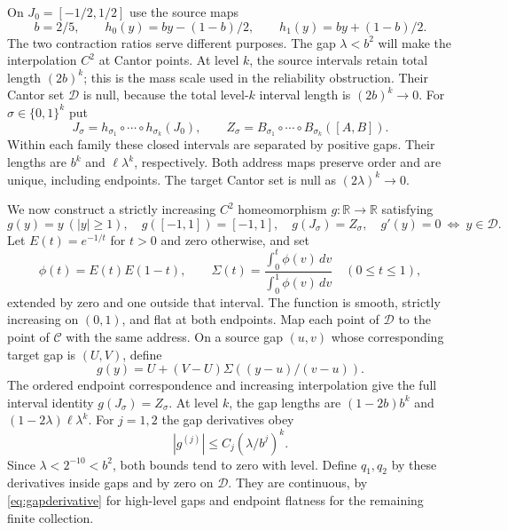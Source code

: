 \documentclass[11pt]{amsart}
\theoremstyle{definition}
\theoremstyle{remark}
\newcommand{\R}{\mathbb R}
\numberwithin{equation}{section}
\begin{document}
On $J_0=[-1/2,1/2]$ use the source maps
\[
b=2/5,\qquad h_0(y)=by-(1-b)/2,
\qquad h_1(y)=by+(1-b)/2.
\]
The two contraction ratios serve different purposes. The gap
$\lambda<b^2$ will make the interpolation $C^2$ at Cantor points.
At level $k$, the source intervals retain total length $(2b)^k$;
this is the mass scale used in the reliability obstruction.
Their Cantor set $\mathcal D$ is null, because the total level-$k$
interval length is $(2b)^k\to0$. For $\sigma\in\{0,1\}^k$ put
\[
J_\sigma=h_{\sigma_1}\circ\cdots\circ h_{\sigma_k}(J_0),
\qquad Z_\sigma=B_{\sigma_1}\circ\cdots\circ B_{\sigma_k}([A,B]).
\]
Within each family these closed intervals are separated by positive
gaps. Their lengths are $b^k$ and $\ell\lambda^k$, respectively.
Both address maps preserve order and are unique, including endpoints.
The target Cantor set is null as $(2\lambda)^k\to0$.

We now construct a strictly increasing $C^2$ homeomorphism
$g:\R\to\R$ satisfying
\begin{equation}\label{eq:flatmapproperties}
g(y)=y\ (|y|\ge1),\quad g([-1,1])=[-1,1],\quad
g(J_\sigma)=Z_\sigma,\quad g'(y)=0\ \Longleftrightarrow\ y\in\mathcal D.
\end{equation}
Let $E(t)=e^{-1/t}$ for $t>0$ and zero otherwise, and set
\[
\phi(t)=E(t)E(1-t),\qquad
\Sigma(t)=\frac{\int_0^t\phi(v)\,dv}{\int_0^1\phi(v)\,dv}
\quad(0\le t\le1),
\]
extended by zero and one outside that interval. The function is smooth,
strictly increasing on $(0,1)$, and flat at both endpoints.
Map each point of $\mathcal D$ to the point of $\mathcal C$ with
the same address. On a source gap $(u,v)$ whose corresponding
target gap is $(U,V)$, define
\begin{equation}\label{eq:gapinterpolation}
g(y)=U+(V-U)\Sigma((y-u)/(v-u)).
\end{equation}
The ordered endpoint correspondence and increasing interpolation
give the full interval identity $g(J_\sigma)=Z_\sigma$.
At level $k$, the gap lengths are $(1-2b)b^k$ and
$(1-2\lambda)\ell\lambda^k$. For $j=1,2$ the gap derivatives obey
\begin{equation}\label{eq:gapderivative}
|g^{(j)}|\le C_j(\lambda/b^j)^k.
\end{equation}
Since $\lambda<2^{-10}<b^2$, both bounds tend to zero with level.
Define $q_1,q_2$ by these derivatives inside gaps and by zero on
$\mathcal D$. They are continuous, by \eqref{eq:gapderivative}
for high-level gaps and endpoint flatness for the remaining finite
collection.
\end{document}
